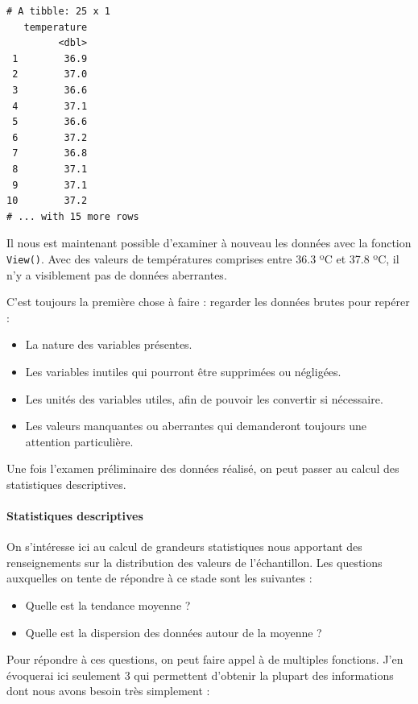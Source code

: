\documentclass[a4paperpaper,]{article}
\providecommand{\tightlist}{%
  \setlength{\itemsep}{0pt}\setlength{\parskip}{0pt}}
\let\oldparagraph\paragraph
\renewcommand{\paragraph}[1]{\oldparagraph{#1}\mbox{}}
\begin{document}
\begin{verbatim}
# A tibble: 25 x 1
   temperature
         <dbl>
 1        36.9
 2        37.0
 3        36.6
 4        37.1
 5        36.6
 6        37.2
 7        36.8
 8        37.1
 9        37.1
10        37.2
# ... with 15 more rows
\end{verbatim}

Il nous est maintenant possible d'examiner à nouveau les données avec la fonction \texttt{View()}. Avec des valeurs de températures comprises entre 36.3 ºC et 37.8 ºC, il n'y a visiblement pas de données aberrantes.

C'est toujours la première chose à faire : regarder les données brutes pour repérer :

\begin{itemize}
\tightlist
\item
  La nature des variables présentes.
\item
  Les variables inutiles qui pourront être supprimées ou négligées.
\item
  Les unités des variables utiles, afin de pouvoir les convertir si nécessaire.
\item
  Les valeurs manquantes ou aberrantes qui demanderont toujours une attention particulière.
\end{itemize}

Une fois l'examen préliminaire des données réalisé, on peut passer au calcul des statistiques descriptives.

\hypertarget{statistiques-descriptives}{%
\paragraph{Statistiques descriptives}\label{statistiques-descriptives}}

On s'intéresse ici au calcul de grandeurs statistiques nous apportant des renseignements sur la distribution des valeurs de l'échantillon. Les questions auxquelles on tente de répondre à ce stade sont les suivantes :

\begin{itemize}
\tightlist
\item
  Quelle est la tendance moyenne ?
\item
  Quelle est la dispersion des données autour de la moyenne ?
\end{itemize}

Pour répondre à ces questions, on peut faire appel à de multiples fonctions. J'en évoquerai ici seulement 3 qui permettent d'obtenir la plupart des informations dont nous avons besoin très simplement :
\end{document}
